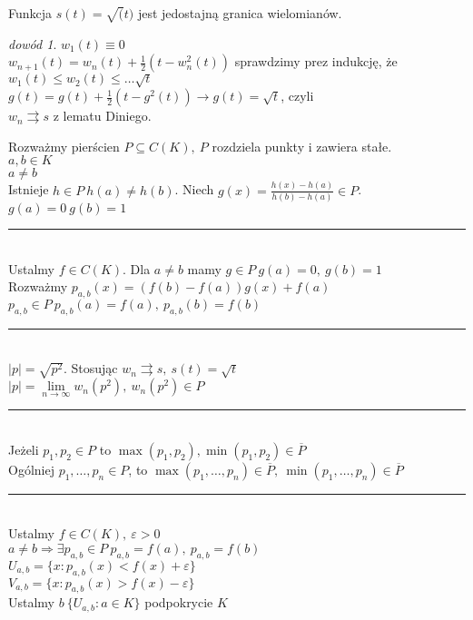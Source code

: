 \documentclass[twoside,10pt]{article}
\theoremstyle{definition}
\theoremstyle{definition}
\theoremstyle{definition}
\theoremstyle{definition}
\theoremstyle{remark}
\newtheorem*{dd}{dowód}
\theoremstyle{definition}
\theoremstyle{definition}
\theoremstyle{definition}
\theoremstyle{definition}
\theoremstyle{definition}
\theoremstyle{definition}
\begin{document}
\begin{lem} 
    Funkcja $s(t) = \sqrt(t)$ jest jedostajną granica wielomianów.
    \begin{dd} 
        $w_1(t) \equiv 0$ \\ 
        $w_{n+1} (t) = w_n (t) + \frac{1}{2} (t - w_n^2 (t))$ sprawdzimy prez indukcję, 
        że $w_1(t) \le w_2(t) \le \ldots \sqrt t$ \\ 
        $g(t) = g(t) + \frac{1}{2} (t - g^2(t)) \to g(t) = \sqrt t$, czyli \\ 
        $w_n \rightrightarrows s$ z lematu Diniego. 
    \end{dd} 
\end{lem} 
Rozważmy pierścien $P \subseteq C(K),\ P$ rozdziela punkty i zawiera stałe. \\ 
$a, b \in K$ \\ 
$a \neq b$ \\ 
Istnieje $h \in P \ h(a) \neq h(b)$. Niech $g(x) = \frac{h(x) - h(a)}{h(b)-h(a)} \in P$. 
$g(a) = 0 \ g(b) = 1$ \\ 
\rule{2cm}{0.4pt} \\ 
Ustalmy $f \in C(K)$. Dla $ a \neq b$ mamy $g \in P \ g(a) = 0,\ g(b)=1$ \\ 
Rozważmy $p_{a,b} (x) = (f(b)-f(a))g(x) + f(a)$ \\ 
$p_{a,b} \in P \ p_{a,b} (a) = f(a), \ p_{a,b} (b) = f(b)$ \\ 
\rule{2cm}{0.4pt}\\ 
$|p|  = \sqrt{p^2}$. Stosując $w_n \rightrightarrows s,\ s(t) = \sqrt t$ \\ 
$|p| = \lim\limits_{n \to \infty} w_n(p^2),\ w_n(p^2) \in P$ \\ 
\rule{2cm}{0.4pt}\\ 
Jeżeli $p_1,p_2 \in P$ to $\max(p_1,p_2), \min(p_1,p_2) \in \overline P$ \\ 
Ogólniej $p_1,\ldots,p_n \in P$, to $\max(p_1,\ldots,p_n) \in \overline P, \ 
\min(p_1,\ldots,p_n) \in \overline P$ \\ 
\rule{2cm}{0.4pt}\\ 
Ustalmy $f \in C(K),\ \varepsilon > 0$ \\ 
$a \neq b \Rightarrow \exists p_{a,b} \in P \ p_{a,b} = f(a),\ p_{a,b} = f(b)$ \\ 
$U_{a,b} = \{x: p_{a,b} (x) < f(x)+\varepsilon \}$ \\ 
$V_{a,b} = \{x: p_{a,b} (x) > f(x)-\varepsilon \}$ \\ 
Ustalmy $b\ \{U_{a,b}: a \in K\}$ podpokrycie $K$ \\ 
\end{document}
